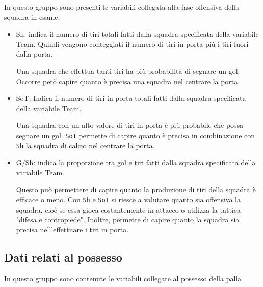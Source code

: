 In questo gruppo sono presenti le variabili collegata alla fase offensiva della squadra in esame.

\begin{itemize}
	
	\item \textsf{Sh}: indica il numero di tiri totali fatti dalla squadra specificata della variabile \textsf{Team}. Quindi vengono conteggiati il numero di tiri in porta più i tiri fuori dalla porta. 
	
	Una squadra che effettua tanti tiri ha più probabilità di segnare un gol. Occorre però capire quanto è precisa una squadra nel centrare la porta.
	\item \textsf{SoT}: Indica il numero di tiri in porta totali fatti dalla squadra specificata della variabile \textsf{Team}. 
	
	Una squadra con un alto valore di tiri in porta è più probabile che possa segnare un gol. \texttt{SoT} permette di capire quanto è precisa in combinazione con \texttt{Sh} la squadra di calcio nel centrare la porta.
	\item \textsf{G/Sh}: indica la proporzione tra gol e tiri fatti dalla squadra specificata della variabile \textsf{Team}. 
	
	Questo può permettere di capire quanto la produzione di tiri della squadra è efficace o meno. Con \texttt{Sh} e \texttt{SoT} si riesce a valutare quanto sia offensiva la squadra, cioè se essa gioca costantemente in attacco o utilizza la tattica "difesa e contropiede". Inoltre, permette di capire quanto la squadra sia precisa nell'effettuare i tiri in porta.
\end{itemize}

\subsection{Dati relati al possesso}

In questo gruppo sono contenute le variabili collegate al possesso della palla 

